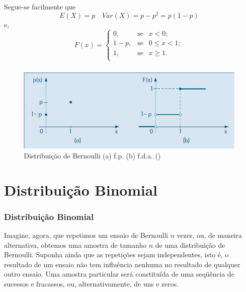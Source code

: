 \documentclass[14pt,aspectratio=1610]{beamer}
\begin{document}
\begin{frame}{}
\frametitle{}
\begin{block}{}
\justifying
Segue-se facilmente que
$$E(X)=p\quad Var(X)=p-p^{2}=p(1-p)$$
e,
$$
F(x)=\left\{
\begin{array}{ccccc}
0,           & \textrm{se} & x<0     ;\\
1-p,& \textrm{se} & 0\leq x<1;\\
1,           & \textrm{se} & x\geq 1 .\\
\end{array}
\right.
$$

\end{block}
\end{frame}

\begin{frame}{}
\frametitle{}
\begin{block}{}
\justifying
\begin{figure}[H]
    \centering
    \includegraphics[scale=0.5]{Figuras/Bernoulli}
    \caption{Distribuição de Bernoulli (a) f.p. (b) f.d.a. (\cite{Morettin09})}
  \end{figure}

\end{block}
\end{frame}

\section{Distribuição Binomial}
\begin{frame}{}
\frametitle{Distribuição Binomial}
\begin{block}{}
\justifying
Imagine, agora, que repetimos um ensaio de Bernoulli $n$ vezes, ou, de maneira
alternativa, obtemos uma amostra de tamanho $n$ de uma distribuição de Bernoulli.
Suponha ainda que as repetições sejam independentes, isto é, o resultado de um ensaio
não tem influência nenhuma no resultado de qualquer outro ensaio. Uma amostra
particular será constituída de uma seqüência de sucessos e fracassos, ou, alternativamente, de uns e zeros.
\end{block}
\end{frame}
\end{document}
